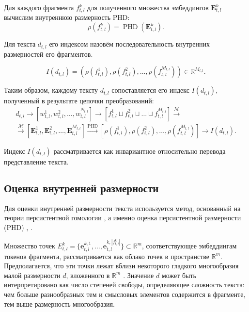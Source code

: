 \documentclass{article}
\begin{document}
Для каждого фрагмента $f_{t,l}^k$ для полученного множества эмбеддингов $\mathbf{E}_{t,l}^k$ вычислим внутреннюю размерность PHD:
$$\rho \left(f_{t,l}^k \right) = \operatorname{PHD}\left(\mathbf{E}_{t,l}^k \right).$$

Для текста $d_{t, l}$ его индексом назовём последовательность внутренних размерностей его фрагментов.

$$I\left(d_{t, l}\right) = \left( \rho \left(f_{t,l}^1 \right), \rho \left(f_{t,l}^2 \right), \dots, \rho \left(f_{t,l}^{M_{t, l}} \right) \right) \in \mathbb{R}^{M_{t, l}}.$$

Таким образом, каждому тексту $d_{t,l}$ сопоставляется его индекс $I\left(d_{t, l}\right)$, полученный в результате цепочки преобразований:
\begin{gather*}
d_{t,l} \rightarrow [w_{t,l}^1, w_{t,l}^2, \dots, w_{t,l}^{N_{t,l}}] \rightarrow [f_{t,l}^1 \sqcup f_{t,l}^2 \sqcup \dots \sqcup f_{t,l}^{M_{t,l}}] \xrightarrow{\mathcal{M}} \\ \xrightarrow{\mathcal{M}} [\mathbf{E}_{t,l}^1, \mathbf{E}_{t,l}^2, \dots, \mathbf{E}_{t,l}^{M_{t,l}}] \xrightarrow{\operatorname{PHD}}  [\rho \left(f_{t,l}^1 \right), \rho\left(f_{t,l}^2 \right), \dots, \rho\left(f_{t,l}^{M_{t,l}} \right)] \rightarrow I(d_{t,l}).\end{gather*}

Индекс $I(d_{t,l})$ рассматривается как инвариантное относительно перевода представление текста.

\subsection{Оценка внутренней размерности}
Для оценки внутренней размерности текста используется метод, основанный на теории персистентной гомологии \cite{S_A_Barannikov1994-fw}, а именно оценка персистентной размерности (PHD) \cite{Adams_2020}, \cite{schweinhart2019persistenthomologyupperbox}. 

Множество точек $E_{t,l}^k = \{\mathbf{e}_{t,l}^{k,1}, \dots, \mathbf{e}_{t,l}^{k,|f_{t,l}^k|}\} \subset \mathbb{R}^m$, соответствующее эмбеддингам токенов фрагмента, рассматривается как облако точек в пространстве $\mathbb{R}^m$. Предполагается, что эти точки лежат вблизи некоторого гладкого многообразия малой размерности $d$, вложенного в $\mathbb{R}^m$ \cite{Goodfellow-et-al-2016}. Значение $d$ может быть интерпретировано как число степеней свободы, определяющее сложность текста: чем больше разнообразных тем и смысловых элементов содержится в фрагменте, тем выше размерность многообразия.
\end{document}
